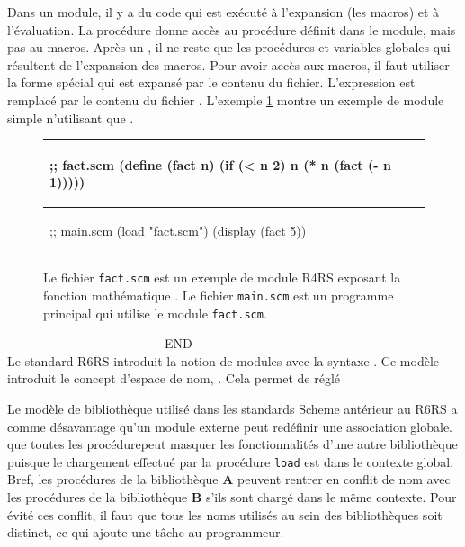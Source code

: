 Dans un module, il y a du code qui est exécuté à l'expansion (les macros) et à
l'évaluation. La procédure  donne accès au
procédure définit dans le module, mais pas au macros.  Après un
, il ne reste que les procédures et variables globales qui
résultent de l'expansion des macros.  Pour avoir accès aux macros, il faut
utiliser la forme spécial  qui est expansé par le contenu du
fichier.  L'expression  est remplacé par le
contenu du fichier . L'exemple \ref{fig:r4rs_fact}
montre un exemple de module simple n'utilisant que .

\begin{figure}[ht]
  \begin{center}
    \begin{tabular}{|l|}
    \hline
    \begin{mplisting}{0.4}
;; fact.scm
(define (fact n)
  (if (< n 2)
    n
    (* n (fact (- n 1)))))
\end{mplisting} \\\hline
    \begin{mplisting}{0.4}
;; main.scm
(load "fact.scm")
(display (fact 5))
\end{mplisting} \\\hline
    \end{tabular}
  \end{center}

  \caption{Le fichier \texttt{fact.scm} est un exemple de module R4RS exposant
  la fonction mathématique . Le fichier \texttt{main.scm} est un
  programme principal qui utilise le module \texttt{fact.scm}.}
  \label{fig:r4rs_fact}
\end{figure}

--------------------------------------END---------------------------------------\\

Le standard R6RS\cite{Scheme:R6RS} introduit la notion de modules avec la
syntaxe . Ce modèle introduit le concept d'espace de nom,
. Cela permet de réglé

Le modèle de bibliothèque utilisé dans les standards Scheme antérieur au
R6RS\cite{Scheme:R6RS} a comme désavantage qu'un module externe peut redéfinir
une association globale.
que toutes les procédurepeut masquer les
fonctionnalités d'une autre bibliothèque puisque le chargement effectué par la
procédure \texttt{load} est dans le contexte global. Bref, les procédures de la
bibliothèque \textbf{A} peuvent rentrer en conflit de nom avec les procédures
de la bibliothèque \textbf{B} s'ils sont chargé dans le même contexte.  Pour
évité ces conflit, il faut que tous les noms utilisés au sein des bibliothèques
soit distinct, ce qui ajoute une tâche au programmeur.


